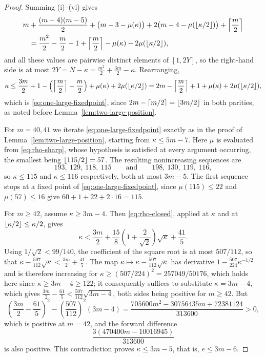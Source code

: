 \documentclass[11pt]{article}
\theoremstyle{definition}
\theoremstyle{remark}
\numberwithin{equation}{section}
\DeclarePairedDelimiter{\floor}{\lfloor}{\rfloor}
\DeclarePairedDelimiter{\ceil}{\lceil}{\rceil}
\begin{document}
\begin{proof}
Summing (i)--(vi) gives
\begin{align*}
  m&+\frac{(m-4)(m-5)}2+\bigl(m-3-\mu(\kappa)\bigr)
  +2\bigl(m-4-\mu(\floor{\kappa/2})\bigr)+\ceil*{\frac m2}\\
  &=\frac{m^2}2-\frac m2-1+\ceil*{\frac m2}-\mu(\kappa)-2\mu(\floor{\kappa/2}),
\end{align*}
and all these values are pairwise distinct elements of $[1,2Y]$, so the
right-hand side is at most $2Y=N-\kappa=\tfrac{m^2}2+\tfrac{3m}2-\kappa$.
Rearranging,
\[
  \kappa\le\frac{3m}2+1-\left(\ceil*{\frac m2}-\frac m2\right)
  +\mu(\kappa)+2\mu(\floor{\kappa/2})
  =2m-\ceil*{\frac m2}+1+\mu(\kappa)+2\mu(\floor{\kappa/2}),
\]
which is \eqref{eq:one-large-fixedpoint}, since $2m-\ceil{m/2}=\floor{3m/2}$ in
both parities, as noted before Lemma~\ref{lem:two-large-position}.

For $m=40,41$ we iterate \eqref{eq:one-large-fixedpoint} exactly as in the proof
of Lemma~\ref{lem:two-large-position}, starting from $\kappa\le5m-7$. Here $\mu$ is
evaluated from \eqref{eq:rho-sharp}, whose hypothesis is satisfied at every
argument occurring, the smallest being $\floor{115/2}=57$. The resulting
nonincreasing sequences are
\[
  193,\ 129,\ 118,\ 115
  \qquad\text{and}\qquad
  198,\ 130,\ 119,\ 116,
\]
so $\kappa\le115$ and $\kappa\le116$ respectively, both at most $3m-5$. The first
sequence stops at a fixed point of \eqref{eq:one-large-fixedpoint}, since
$\mu(115)\le22$ and $\mu(57)\le16$ give $60+1+22+2\cdot16=115$.

For $m\ge42$, assume $\kappa\ge3m-4$. Then \eqref{eq:rho-closed}, applied at
$\kappa$ and at $\floor{\kappa/2}\le\kappa/2$, gives
\[
  \kappa<\frac{3m}{2}
  +\frac{15}{8}\left(1+\frac2{\sqrt2}\right)\sqrt\kappa
  +\frac{41}{5}.
\]
Using $1/\sqrt2<99/140$, the coefficient of the square root is at most $507/112$,
so that $\kappa-\tfrac{507}{112}\sqrt\kappa<\tfrac{3m}2+\tfrac{41}5$. The map
$\kappa\mapsto\kappa-\tfrac{507}{112}\sqrt\kappa$ has derivative
$1-\tfrac{507}{224}\kappa^{-1/2}$ and is therefore increasing for
$\kappa\ge(507/224)^2=257049/50176$, which holds here since
$\kappa\ge3m-4\ge122$; it consequently suffices to substitute $\kappa=3m-4$,
which gives $\tfrac{3m}2-\tfrac{61}5<\tfrac{507}{112}\sqrt{3m-4}$, both sides
being positive for $m\ge42$. But
\[
  \left(\frac{3m}{2}-\frac{61}{5}\right)^2
  -\left(\frac{507}{112}\right)^2(3m-4)
  =\frac{705600m^2-30756435m+72381124}{313600}>0,
\]
which is positive at $m=42$, and the forward difference
\[
  \frac{3(470400m-10016945)}{313600}
\]
is also positive. This contradiction proves $\kappa\le3m-5$, that is,
$e\le3m-6$.
\end{proof}
\end{document}

